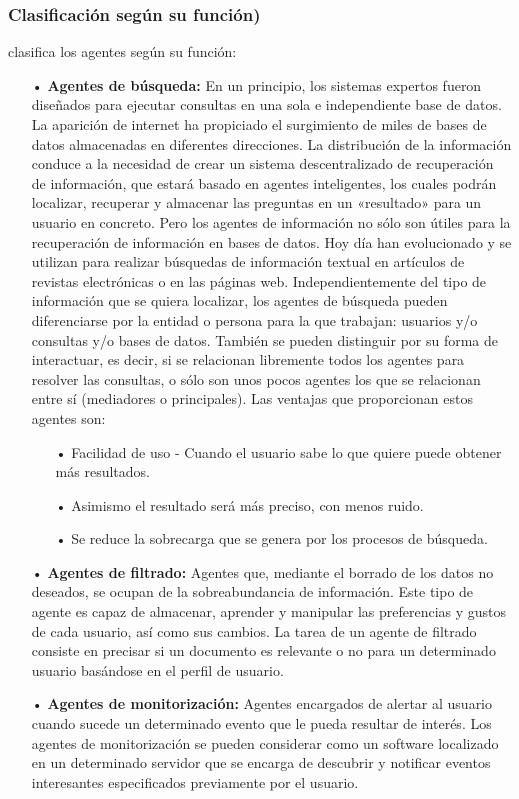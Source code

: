 \subsubsection{Clasificación según su función)}

 \cite{Carrascosa} clasifica los agentes según su función:

\begin{itemize}
\item[•] {\bf Agentes de búsqueda:} \vskip 0.1cm
En un principio, los sistemas expertos fueron diseñados para ejecutar consultas en una sola e independiente base de datos. La aparición de internet ha propiciado el surgimiento de miles de bases de datos almacenadas en diferentes direcciones.
\vskip 0.1cm
La distribución de la información conduce a la necesidad de crear un sistema descentralizado de recuperación de información, que estará basado en agentes inteligentes, los cuales podrán localizar, recuperar y almacenar las preguntas en un «resultado» para un usuario en concreto.
\vskip 0.1cm
Pero los agentes de información no sólo son útiles para la recuperación de información en bases de datos. Hoy día han evolucionado y se utilizan para realizar búsquedas de información textual en artículos de revistas electrónicas o en las páginas web. Independientemente del tipo de información que se quiera localizar, los agentes de búsqueda pueden diferenciarse por la entidad o persona para la que trabajan: usuarios y/o consultas y/o bases de datos. También se pueden distinguir por su forma de interactuar, es decir, si se relacionan libremente todos los agentes para resolver las consultas, o sólo son unos pocos agentes los que se relacionan entre sí (mediadores o principales).
\vskip 0.1cm
Las ventajas que proporcionan estos agentes son:
\begin{itemize}
\item[•] Facilidad de uso - Cuando el usuario sabe lo que quiere puede obtener más resultados.
\item[•] Asimismo el resultado será más preciso, con menos ruido.
\item[•] Se reduce la sobrecarga que se genera por los procesos de búsqueda.
\end{itemize}

\item[•] {\bf Agentes de filtrado:} \vskip 0.1cm
Agentes que, mediante el borrado de los datos no deseados, se ocupan de la sobreabundancia de información. Este tipo de agente es capaz de almacenar, aprender y manipular las preferencias y gustos de cada usuario, así como sus cambios. La tarea de un agente de filtrado consiste en precisar si un documento es relevante o no para un determinado usuario basándose en el perfil de usuario.

\item[•] {\bf Agentes de monitorización:} \vskip 0.1cm
Agentes encargados de alertar al usuario cuando sucede un determinado evento que le pueda resultar de interés. Los agentes de monitorización se pueden considerar como un software localizado en un determinado servidor que se encarga de descubrir y notificar eventos interesantes especificados previamente por el usuario.

\end{itemize}

